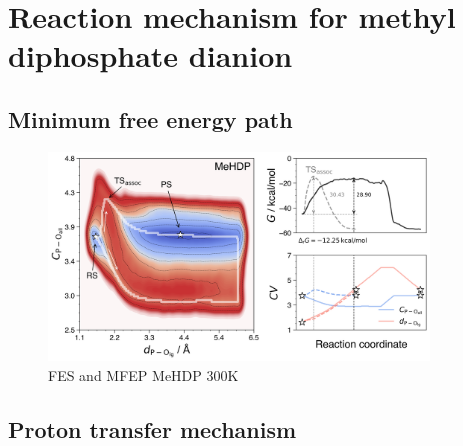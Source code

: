 \clearpage
\section{Reaction mechanism for methyl diphosphate dianion}





\subsection{Minimum free energy path}

\begin{figure}[ht]
    \centering
    \includegraphics[width=0.9\textwidth]{Figures/4_Results/results_MeHDP_300K_fes_mfep.png}
    \caption{FES and MFEP MeHDP 300K}
    \label{fig:mehdp_300k_fes_mfep}
\end{figure}


\subsection{Proton transfer mechanism}



